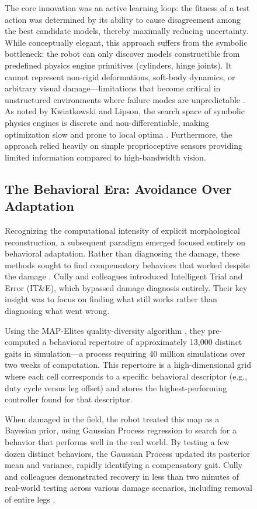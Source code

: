 \documentclass[12pt,a4paper,oneside]{report}
\begin{document}
\begin{figure}[H]
The core innovation was an active learning loop: the fitness of a test action was determined by its ability to cause disagreement among the best candidate models, thereby maximally reducing uncertainty. While conceptually elegant, this approach suffers from the symbolic bottleneck: the robot can only discover models constructible from predefined physics engine primitives (cylinders, hinge joints). It cannot represent non-rigid deformations, soft-body dynamics, or arbitrary visual damage---limitations that become critical in unstructured environments where failure modes are unpredictable \cite{kwiatkowski2019task}. As noted by Kwiatkowski and Lipson, the search space of symbolic physics engines is discrete and non-differentiable, making optimization slow and prone to local optima \cite{kwiatkowski2019task}. Furthermore, the approach relied heavily on simple proprioceptive sensors providing limited information compared to high-bandwidth vision.

\subsection{The Behavioral Era: Avoidance Over Adaptation}
\label{subsec:behavioral_era}

Recognizing the computational intensity of explicit morphological reconstruction, a subsequent paradigm emerged focused entirely on behavioral adaptation. Rather than diagnosing the damage, these methods sought to find compensatory behaviors that worked despite the damage \cite{cully2015robots}. Cully and colleagues introduced Intelligent Trial and Error (IT\&E), which bypassed damage diagnosis entirely. Their key insight was to focus on finding what still works rather than diagnosing what went wrong.

Using the MAP-Elites quality-diversity algorithm \cite{mouret2015illuminating}, they pre-computed a behavioral repertoire of approximately 13,000 distinct gaits in simulation---a process requiring 40 million simulations over two weeks of computation. This repertoire is a high-dimensional grid where each cell corresponds to a specific behavioral descriptor (e.g., duty cycle versus leg offset) and stores the highest-performing controller found for that descriptor.

When damaged in the field, the robot treated this map as a Bayesian prior, using Gaussian Process regression to search for a behavior that performs well in the real world. By testing a few dozen distinct behaviors, the Gaussian Process updated its posterior mean and variance, rapidly identifying a compensatory gait. Cully and colleagues demonstrated recovery in less than two minutes of real-world testing across various damage scenarios, including removal of entire legs \cite{cully2015robots}.


\end{figure}
\end{document}
